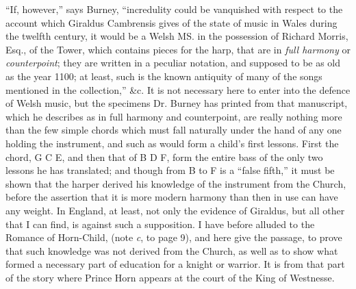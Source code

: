 “If, however,” says Burney, “incredulity could be vanquished with respect to
the account which Giraldus Cambrensis gives of the state of music in Wales
during the twelfth century, it would be a Welsh MS. in the possession of Richard
Morris, Esq., of the Tower, which contains pieces for the harp, that are in \textit{full
harmony} or \textit{counterpoint}; they are written in a peculiar notation, and supposed
to be as old as the year 1100; at least, such is the known antiquity of many of
the songs mentioned in the collection,” \&c. It is not necessary here to enter
into the defence of Welsh music, but the specimens Dr. Burney has printed from
that manuscript, which he describes as in full harmony and counterpoint, are
really nothing more than the few simple chords which must fall naturally under
the hand of any one holding the instrument, and such as would form a child’s
first lessons. First the chord, G C E, and then that of B D F, form the entire
bass of the only two lessons he has translated; and though from B to F is
a “false fifth,” it must be shown that the harper derived his knowledge of
the instrument from the Church, before the assertion that it is more modern
harmony than then in use can have any weight. In England, at least, not
only the evidence of Giraldus, but all other that I can find, is against such a
supposition. I have before alluded to the Romance of Horn-Child, (note \textit{c}, to
page 9), and here give the passage, to prove that such knowledge was not
derived from the Church, as well as to show what formed a necessary part of
education for a knight or warrior. It is from that part of the story where
Prince Horn appears at the court of the King of Westnesse.

\settowidth{\versewidth}{His steward, and [to] him said thus}

